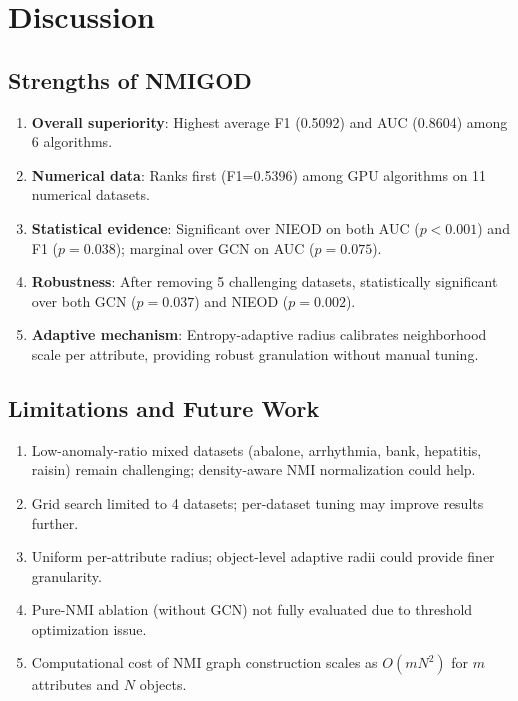 \documentclass[11pt,a4paper]{article}
\begin{document}
\section{Discussion}
\subsection{Strengths of NMIGOD}
\begin{enumerate}[leftmargin=*]
\item \textbf{Overall superiority}: Highest average F1 (0.5092) and AUC (0.8604) among 6 algorithms.
\item \textbf{Numerical data}: Ranks first (F1=0.5396) among GPU algorithms on 11 numerical datasets.
\item \textbf{Statistical evidence}: Significant over NIEOD on both AUC ($p<0.001$) and F1 ($p=0.038$); marginal over GCN on AUC ($p=0.075$).
\item \textbf{Robustness}: After removing 5 challenging datasets, statistically significant over both GCN ($p=0.037$) and NIEOD ($p=0.002$).
\item \textbf{Adaptive mechanism}: Entropy-adaptive radius calibrates neighborhood scale per attribute, providing robust granulation without manual tuning.
\end{enumerate}
\subsection{Limitations and Future Work}
\begin{enumerate}[leftmargin=*]
\item Low-anomaly-ratio mixed datasets (abalone, arrhythmia, bank, hepatitis, raisin) remain challenging; density-aware NMI normalization could help.
\item Grid search limited to 4 datasets; per-dataset tuning may improve results further.
\item Uniform per-attribute radius; object-level adaptive radii could provide finer granularity.
\item Pure-NMI ablation (without GCN) not fully evaluated due to threshold optimization issue.
\item Computational cost of NMI graph construction scales as $O(mN^2)$ for $m$ attributes and $N$ objects.
\end{enumerate}
\end{document}
